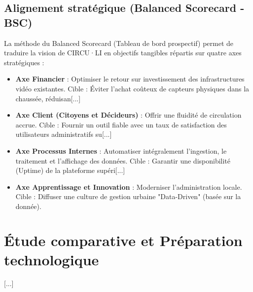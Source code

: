 \subsection{Alignement stratégique (Balanced Scorecard - BSC)}
La méthode du Balanced Scorecard (Tableau de bord prospectif) permet de traduire la vision de CIRCU·LI en objectifs tangibles répartis sur quatre axes stratégiques :
\begin{itemize}
    \item \textbf{Axe Financier} : Optimiser le retour sur investissement des infrastructures vidéo existantes. Cible : Éviter l'achat coûteux de capteurs physiques dans la chaussée, réduisan[...]
    \item \textbf{Axe Client (Citoyens et Décideurs)} : Offrir une fluidité de circulation accrue. Cible : Fournir un outil fiable avec un taux de satisfaction des utilisateurs administratifs su[...]
    \item \textbf{Axe Processus Internes} : Automatiser intégralement l'ingestion, le traitement et l'affichage des données. Cible : Garantir une disponibilité (Uptime) de la plateforme supéri[...]
    \item \textbf{Axe Apprentissage et Innovation} : Moderniser l'administration locale. Cible : Diffuser une culture de gestion urbaine "Data-Driven" (basée sur la donnée).
\end{itemize}

\section{Étude comparative et Préparation technologique}

[...]